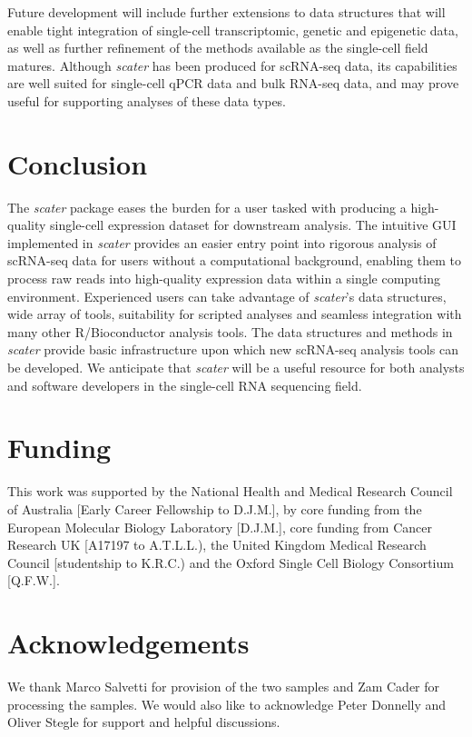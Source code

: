 \documentclass{bioinfo}
\begin{document}
Future development will include further extensions to data structures that will enable tight integration of single-cell transcriptomic, genetic and epigenetic data, as well as further refinement of the methods available as the single-cell field matures. Although \emph{scater} has been produced for
scRNA-seq data, its capabilities are well suited for single-cell qPCR data
and bulk RNA-seq data, and may prove useful for supporting analyses of these data types.


\section{Conclusion}\label{conclusion}

The \emph{scater} package eases the burden for a user tasked with
producing a high-quality single-cell expression dataset for downstream analysis. The intuitive GUI implemented in \emph{scater} provides an easier entry point into rigorous analysis of scRNA-seq data for users without a
computational background, enabling them to process raw reads into high-quality expression data within a single computing environment. Experienced users can take advantage of \emph{scater}'s data structures, wide array of tools, suitability for scripted analyses and seamless integration with many other R/Bioconductor analysis tools. The data structures and methods in
\emph{scater} provide basic infrastructure upon which new scRNA-seq
analysis tools can be developed. We anticipate that \emph{scater} will be a
useful resource for both analysts and software developers in the
single-cell RNA sequencing field.\vspace*{-10pt}


\section*{Funding}

This work was supported by the National Health and Medical Research Council of Australia [Early Career Fellowship to D.J.M.], by core funding from the European Molecular Biology Laboratory [D.J.M.], core funding from Cancer Research UK [A17197 to A.T.L.L.), the United Kingdom Medical Research Council [studentship to K.R.C.) and the Oxford Single Cell Biology Consortium [Q.F.W.].\vspace*{-12pt}


\section*{Acknowledgements}\label{acknowledgements}

We thank Marco Salvetti for provision of the two samples and Zam Cader for processing the samples. We would also like to acknowledge Peter Donnelly and Oliver Stegle for support and helpful discussions.\vspace*{-12pt}


%
%
%
%
%

\end{document}

